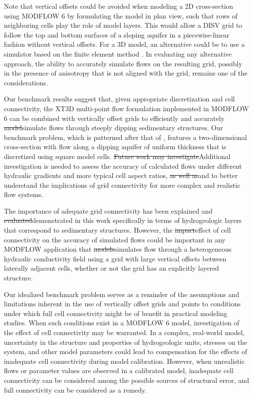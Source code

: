 \documentclass{article}
\begin{document}
{\color{red} Note that vertical offsets could be avoided when modeling a 2D cross-section using MODFLOW 6 by formulating the model in plan view, such that rows of neighboring cells play the role of model layers. This would allow a DISV grid to follow the top and bottom surfaces of a sloping aquifer in a piecewise-linear fashion without vertical offsets. For a 3D model, an alternative could be to use a simulator based on the finite element method \citep[see, e.g.,][]{yager2009anisotropy}. In evaluating any alternative approach, the ability to accurately simulate flows on the resulting grid, possibly in the presence of anisotropy that is not aligned with the grid, remains one of the considerations.}

Our benchmark results suggest that, given appropriate discretization and cell connectivity, the XT3D multi-point flow formulation implemented in MODFLOW 6 can be combined with vertically offset grids to efficiently and accurately {\color{red} \sout{model}simulate} flows through steeply dipping sedimentary structures. {\color{red} Our benchmark problem, which is patterned after that of \cite{bardot2023}, features a two-dimensional cross-section with flow along a dipping aquifer of uniform thickness that is discretized using square model cells.} {\color{red} \sout{Future work may investigate}Additional investigation is needed to assess} the accuracy of calculated flows under different hydraulic gradients {\color{red} and more typical cell aspect ratios}, {\color{red} \sout{as well as}and to better understand} the implications of grid connectivity for more complex and realistic flow systems.

The importance of adequate grid connectivity has been explained and {\color{red} \sout{evaluated}demonstrated} in this work specifically in terms of hydrogeologic layers that correspond to sedimentary structures. However, the {\color{red} \sout{impact}effect} of cell connectivity on the accuracy of simulated flows could be important in any MODFLOW application that {\color{red} \sout{models}simulates} flow through a heterogeneous hydraulic conductivity field using a grid with large vertical offsets between laterally adjacent cells, whether or not the grid has an explicitly layered structure. 

{\color{red} Our idealized benchmark problem serves as a reminder of the assumptions and limitations inherent in the use of vertically offset grids and points to conditions under which full cell connectivity might be of benefit in practical modeling studies. When such conditions exist in a MODFLOW 6 model, investigation of the effect of cell connectivity may be warranted. In a complex, real-world model, uncertainty in the structure and properties of hydrogeologic units, stresses on the system, and other model parameters could lead to compensation for the effects of inadequate cell connectivity during model calibration. However, when unrealistic flows or parameter values are observed in a calibrated model, inadequate cell connectivity can be considered among the possible sources of structural error, and full connectivity can be considered as a remedy.}
\end{document}
